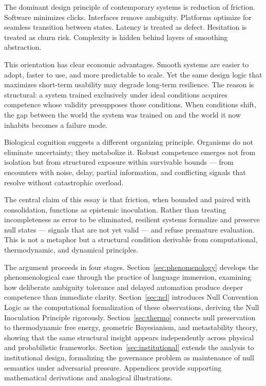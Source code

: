 \documentclass[11pt]{article}
\theoremstyle{remark}
\begin{document}
The dominant design principle of contemporary systems is reduction of friction. Software minimizes clicks. Interfaces remove ambiguity. Platforms optimize for seamless transition between states. Latency is treated as defect. Hesitation is treated as churn risk. Complexity is hidden behind layers of smoothing abstraction.

This orientation has clear economic advantages. Smooth systems are easier to adopt, faster to use, and more predictable to scale. Yet the same design logic that maximizes short-term usability may degrade long-term resilience. The reason is structural: a system trained exclusively under ideal conditions acquires competence whose validity presupposes those conditions. When conditions shift, the gap between the world the system was trained on and the world it now inhabits becomes a failure mode.

Biological cognition suggests a different organizing principle. Organisms do not eliminate uncertainty; they metabolize it. Robust competence emerges not from isolation but from structured exposure within survivable bounds --- from encounters with noise, delay, partial information, and conflicting signals that resolve without catastrophic overload.

The central claim of this essay is that friction, when bounded and paired with consolidation, functions as epistemic inoculation. Rather than treating incompleteness as error to be eliminated, resilient systems formalize and preserve null states --- signals that are not yet valid --- and refuse premature evaluation. This is not a metaphor but a structural condition derivable from computational, thermodynamic, and dynamical principles.

The argument proceeds in four stages. Section~\ref{sec:phenomenology} develops the phenomenological case through the practice of language immersion, examining how deliberate ambiguity tolerance and delayed automation produce deeper competence than immediate clarity. Section~\ref{sec:ncl} introduces Null Convention Logic as the computational formalization of these observations, deriving the Null Inoculation Principle rigorously. Section~\ref{sec:thermo} connects null preservation to thermodynamic free energy, geometric Bayesianism, and metastability theory, showing that the same structural insight appears independently across physical and probabilistic frameworks. Section~\ref{sec:institutional} extends the analysis to institutional design, formalizing the governance problem as maintenance of null semantics under adversarial pressure. Appendices provide supporting mathematical derivations and analogical illustrations.
\end{document}
